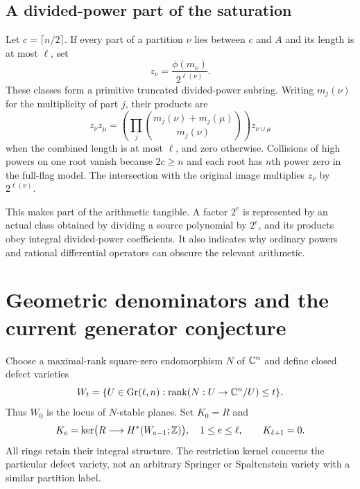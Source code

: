 \subsection{A divided-power part of the saturation}
Let $c=\lceil n/2\rceil$. If every part of a partition $\nu$ lies between $c$ and $A$ and its length is at most $\ell$, set
\[
 z_\nu=\frac{\phi(m_\nu)}{2^{\ell(\nu)}}.
\]
These classes form a primitive truncated divided-power subring. Writing $m_j(\nu)$ for the multiplicity of part $j$, their products are
\[
 z_\nu z_\mu=
 \left(\prod_j\binom{m_j(\nu)+m_j(\mu)}{m_j(\nu)}\right)
 z_{\nu\cup\mu}
\]
when the combined length is at most $\ell$, and zero otherwise. Collisions of high powers on one root vanish because $2c\ge n$ and each root has $n$th power zero in the full-flag model. The intersection with the original image multiplies $z_\nu$ by $2^{\ell(\nu)}$.

This makes part of the arithmetic tangible. A factor $2^e$ is represented by an actual class obtained by dividing a source polynomial by $2^e$, and its products obey integral divided-power coefficients. It also indicates why ordinary powers and rational differential operators can obscure the relevant arithmetic.


\section{Geometric denominators and the current generator conjecture}
Choose a maximal-rank square-zero endomorphism $N$ of $\mathbb C^n$ and define closed defect varieties
\[
 W_t=\{U\in\operatorname{Gr}(\ell,n):\operatorname{rank}(N:U\to\mathbb C^n/U)\le t\}.
\]
Thus $W_0$ is the locus of $N$-stable planes. Set $K_0=R$ and
\[
 K_e=\ker\bigl(R\longrightarrow H^*(W_{e-1};\mathbb Z)\bigr),
 \quad 1\le e\le\ell,\qquad K_{\ell+1}=0.
\]
All rings retain their integral structure. The restriction kernel concerns the particular defect variety, not an arbitrary Springer or Spaltenstein variety with a similar partition label.

